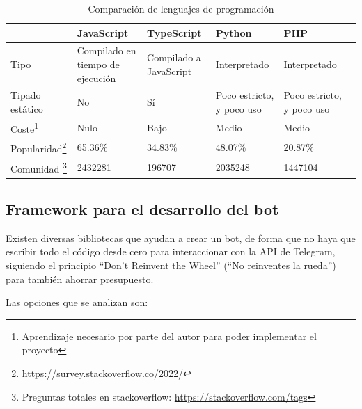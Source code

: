 \begin{table}
\begin{minipage}{\textwidth}
\begin{tabularx}{\textwidth}{|l|X|X|X|X|}
\hline
                                                    & JavaScript                       & TypeScript             & Python                    & PHP                       \\
\hline
Tipo                                                & Compilado en tiempo de ejecución & Compilado a JavaScript & Interpretado              & Interpretado              \\
\hline
Tipado estático                                     & No                               & Sí                     & Poco estricto, y poco uso & Poco estricto, y poco uso \\
\hline
Coste\footnote{Aprendizaje necesario por parte del autor para poder implementar el proyecto}                                & Nulo                             & Bajo                   & Medio                     & Medio                     \\
\hline
Popularidad\footnote{\url{https://survey.stackoverflow.co/2022/}} & 65.36\%                          & 34.83\%                & 48.07\%                   & 20.87\%                   \\
\hline
Comunidad \footnote{Preguntas totales en stackoverflow: \url{https://stackoverflow.com/tags}}      & 2432281                          & 196707                 & 2035248                   & 1447104                  &
\hline
\end{tabularx}
\end{minipage}
\caption{Comparación de lenguajes de programación}\label{tab:comparacionLenguajes}
\end{table}


\subsection{Framework para el desarrollo del bot}

Existen diversas bibliotecas que ayudan a crear un bot, de forma que no haya que escribir todo el código desde cero para interaccionar con la API de Telegram, siguiendo el principio ``Don't Reinvent the Wheel'' (``No reinventes la rueda'') para también ahorrar presupuesto.

Las opciones que se analizan son:

